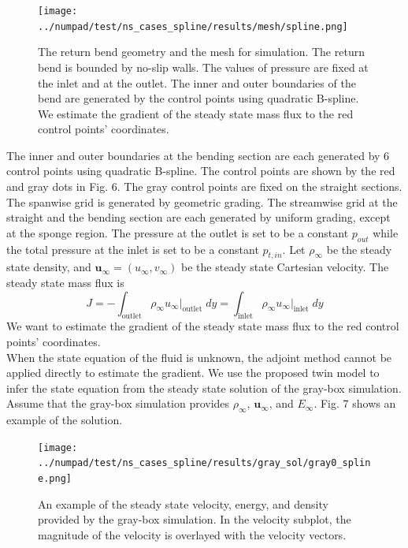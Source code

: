 \documentclass[a4paper,onecolumn]{article}
\theoremstyle{remark}
\begin{document}
\begin{figure}[H]\begin{center}
    \texttt{[image: ../numpad/test/ns\_cases\_spline/results/mesh/spline.png]}
    \caption{The return bend geometry and the mesh for simulation. The return bend is bounded by 
    no-slip walls. The values of pressure
    are fixed at the inlet and at the outlet. 
    The inner and outer boundaries of the bend are generated by the control points
    using quadratic B-spline.
    We estimate the gradient of the steady state mass flux
    to the red control points' coordinates.}
    \label{NS mesh}
\end{center}\end{figure}

\indent The inner and outer boundaries at the bending section 
are each generated by 6 control points using quadratic B-spline. 
The control points are shown by the red and gray dots in Fig. 6. The gray control points are fixed 
on the straight sections.
The spanwise grid is generated by geometric grading. The streamwise
grid at the straight and the bending section are each generated
by uniform grading, except at the sponge region.
The pressure at the outlet is set to be a constant $p_{out}$ while
the total pressure at the inlet is set to be a constant $p_{t,in}$.
Let $\rho_\infty$ be the steady state density, and
$\boldsymbol{u}_\infty = (u_\infty, v_\infty)$ be the steady state Cartesian velocity.
The steady state mass flux is
\begin{equation}
    J = - \int_{\textrm{outlet}} \rho_\infty u_\infty \big|_{\textrm{outlet}} \; dy=
    \int_{\textrm{inlet}} \rho_\infty u_\infty\big|_{\textrm{inlet}} \; dy
    \label{mass flux}
\end{equation}
We want to estimate the gradient of the steady state mass flux
to the red control points' coordinates.
\\

\indent When the state equation of the fluid is unknown, the 
adjoint method cannot be applied directly
to estimate the gradient. We use the proposed twin model to infer the state
equation from the steady state solution of the gray-box simulation.
Assume that the gray-box simulation provides $\rho_\infty$, $\boldsymbol{u}_\infty$,
and $E_\infty$. 
Fig. 7 shows an example of the solution.
\begin{figure}[H]\begin{center}
    \texttt{[image: ../numpad/test/ns\_cases\_spline/results/gray\_sol/gray0\_spline.png]}
    \caption{An example of the steady state velocity, energy, and density provided 
    by the gray-box simulation. In the velocity subplot, the 
    magnitude of the velocity is overlayed with the velocity vectors.}
    \label{gray sol}
\end{center}\end{figure}
\end{document}
